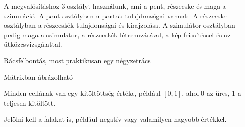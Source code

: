 A megvalósításhoz 3 osztályt használunk, ami a pont, részecske és maga a szimuláció. A pont osztályban a pontok tulajdonságai vannak. A részecske osztályban  a részecskék tulajdonságai és kirajzolása. A szimulátor osztályban pedig maga a szimulátor, a részecskék létrehozásával, a kép frissítéssel és az ütközésvizsgálattal. 


Rácsfelbontás, most praktikusan egy négyzetrács

Mátrixban ábrázolható

Minden cellának van egy kitöltöttség értéke, például $[0, 1]$, ahol 0 az üres, 1 a teljesen kitöltött.

Jelölni kell a falakat is, például negatív vagy valamilyen nagyobb értékkel.

